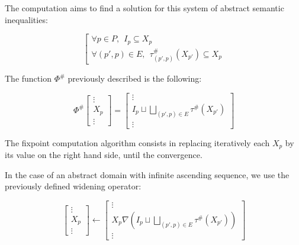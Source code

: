 \documentclass[a4paper,english,titlepage,11pt]{report}
\newcommand*\system[1]{\left[ \begin{array}{lllll}#1 \end{array}\right.}
\begin{document}
The computation aims to find a solution for this system of abstract semantic
inequalities:

$$\system{
\forall p \in P, \ \ I_p \subseteq X_p \\
\forall (p',p) \in E,\ \  \tau^\#_{(p',p)}(X_{p'}) \subseteq X_p
}$$

\begin{figure}[h!]
\centering
{}
\end{figure}

The function $\Phi^\#$ previously described is the following:

$$\Phi^\#\left[ \begin{array}{c}
\vdots \\
X_p \\
\vdots
\end{array} \right] = \left[ \begin{array}{c} 
\vdots \\
I_p \sqcup \displaystyle \bigsqcup_{(p',p) \in E} \tau^\# (X_{p'}) \\
\vdots
\end{array} \right]$$

The fixpoint computation algorithm consists in replacing iteratively each $X_p$ by its value
on the right hand side, until the convergence.

In the case of an abstract domain with infinite ascending sequence, we use the
previously defined widening operator:

$$\left[ \begin{array}{c}
\vdots \\
X_p \\
\vdots
\end{array} \right] \longleftarrow \left[ \begin{array}{c} 
\vdots \\
X_p \nabla \left( I_p \sqcup \displaystyle \bigsqcup_{(p',p) \in E} \tau^\#
(X_{p'}) \right) \\
\vdots
\end{array} \right]$$
\end{document}
